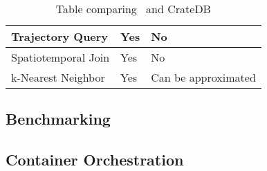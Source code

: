 \begin{table}[h]
\begin{tabular}{|P{3.3cm}|P{6cm}|P{4cm}|}
		\hline
		Trajectory Query                  & Yes                                                                 & No                                                     \\
		\hline
		Spatiotemporal Join               & Yes                                                                 & No                                                \\
		\hline
		k-Nearest Neighbor                & Yes                                                                 & Can be approximated   \\
		\hline
	\end{tabular}
	\caption{Table comparing \mobilitydbc~and CrateDB}
	\label{tab:mobilitydb_vs_cratedb}
\end{table}

\subsection{Benchmarking}

\subsection{Container Orchestration}



